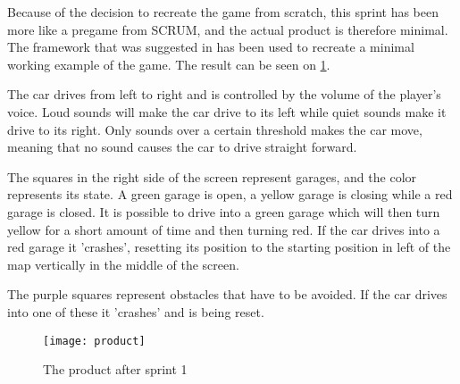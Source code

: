 Because of the decision to recreate the game from scratch, this sprint has been more like a pregame from SCRUM, and the actual product is therefore minimal.
The framework that was suggested in  has been used to recreate a minimal working example of the game.
The result can be seen on \cref{product-sprint1}.

The car drives from left to right and is controlled by the volume of the player's voice. 
Loud sounds will make the car drive to its left while quiet sounds make it drive to its right.
Only sounds over a certain threshold makes the car move, meaning that no sound causes the car to drive straight forward.

The squares in the right side of the screen represent garages, and the color represents its state. 
A green garage is open, a yellow garage is closing while a red garage is closed.
It is possible to drive into a green garage which will then turn yellow for a short amount of time and then turning red.
If the car drives into a red garage it 'crashes', resetting its position to the starting position in left of the map vertically in the middle of the screen.

The purple squares represent obstacles that have to be avoided. 
If the car drives into one of these it 'crashes' and is being reset.


\begin{figure}
\texttt{[image: product]}
\caption{The product after sprint 1}
\label{product-sprint1}
\end{figure}